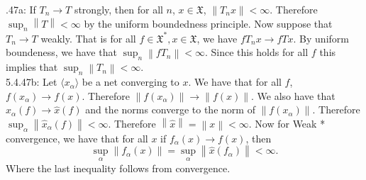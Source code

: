 \documentclass[letterpaper]{article}
\newcommand{\lan}{\langle}
\newcommand{\ran}{\rangle}
\newcommand{\norm}[1]{\left\lVert#1\right\rVert}
\newcommand{\inn}[1]{\lan#1\ran}
\newcommand{\X}{\mathfrak{X}}
\begin{document}
 .47a: If $T_n \to T$ strongly, then for all $n$, $x\in \X$, $\norm{T_n x} < \infty$. Therefore $\sup_n \norm{T} < \infty$ by the uniform boundedness principle. 
Now suppose that $T_n \to T$ weakly. That is for all $f\in \X^* , x\in \X$, we have $fT_nx \to fTx$. By uniform boundeness, we have that $\sup_n \norm{fT_n}<\infty$. Since this holds for all $f$ this implies that $\sup_n \norm{T_n}<\infty$. 
\newline \\ 5.4.47b: Let $\inn{x_\alpha}$ be a net converging to $x$. We have that for all $f$, $f(x_\alpha) \to f(x)$. Therefore $\norm{f(x_\alpha)} \to \norm{f(x)}$. 
We also have that $\hat{x}_\alpha(f) \to \hat{x}(f)$ and the norms converge to the norm of $\norm{f(x_\alpha)}$. Therefore $\sup_\alpha \norm{\hat{x}_\alpha (f)} <\infty$. Therefore $\norm{\hat{x}}  = \norm{x} < \infty$. Now for Weak * convergence, we have that for all $x$ if $f_\alpha(x) \to f(x)$, then $$\sup_\alpha \norm{f_\alpha(x)} = \sup_\alpha \norm{\hat{x}(f_\alpha)} < \infty.$$
Where the last inequality follows from convergence. 
\end{document}
